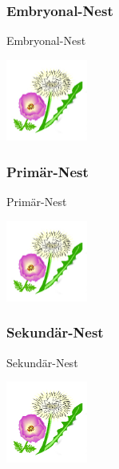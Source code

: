 \documentclass[aspectratio=169]{beamer}
\begin{document}
\subsubsection[Embryonal-Nest]{Embryonal-Nest}


	\begin{frame}{Embryonal-Nest}
		\begin{center}	
			\includegraphics[width=0.2\textwidth]{figures/BH-Logo_Quat.png}
		\end{center}

		\end{frame}

\subsubsection[Sekundär-Nest]{Primär-Nest}


		\begin{frame}{Primär-Nest}
			\begin{center}	
				\includegraphics[width=0.2\textwidth]{figures/BH-Logo_Quat.png}
			\end{center}
	
			\end{frame}

\subsubsection[Sekundär-Nest]{Sekundär-Nest}


			\begin{frame}{Sekundär-Nest}
				\begin{center}	
					\includegraphics[width=0.2\textwidth]{figures/BH-Logo_Quat.png}
				\end{center}
		
				\end{frame}
\end{document}
